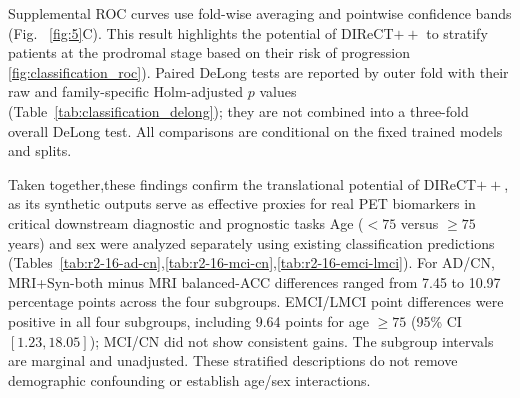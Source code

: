 \documentclass{article}
\providecommand{\DIFaddtex}[1]{{\protect\color{blue} \sf #1}} %
\providecommand{\DIFdeltex}[1]{{\protect\color{red} \scriptsize #1}} %
\providecommand{\DIFaddbegin}{} %
\providecommand{\DIFaddend}{} %
\providecommand{\DIFdelbegin}{} %
\providecommand{\DIFdelend}{} %
\providecommand{\DIFadd}[1]{\texorpdfstring{\DIFaddtex{#1}}{#1}} %
\providecommand{\DIFdel}[1]{\texorpdfstring{\DIFdeltex{#1}}{}} %
\newcommand{\DIFscaledelfig}{0.5}
\newlength{\DIFdelgraphicswidth} %
\newlength{\DIFdelgraphicsheight} %
\newcommand{\DIFaddincludegraphics}[2][]{{\color{blue}\fbox{\DIFOincludegraphics[#1]{#2}}}} %
\newcommand{\DIFdelincludegraphics}[2][]{%
\sbox{\DIFdelgraphicsbox}{\DIFOincludegraphics[#1]{#2}}%
\settoboxwidth{\DIFdelgraphicswidth}{\DIFdelgraphicsbox} %
\settoboxtotalheight{\DIFdelgraphicsheight}{\DIFdelgraphicsbox} %
\scalebox{\DIFscaledelfig}{%
\parbox[b]{\DIFdelgraphicswidth}{\usebox{\DIFdelgraphicsbox}\\[-\baselineskip] \rule{\DIFdelgraphicswidth}{0em}}\llap{\resizebox{\DIFdelgraphicswidth}{\DIFdelgraphicsheight}{%
\setlength{\unitlength}{\DIFdelgraphicswidth}%
\begin{picture}(1,1)%
\thicklines\linethickness{2pt} %
{\color[rgb]{1,0,0}\put(0,0){\framebox(1,1){}}}%
{\color[rgb]{1,0,0}\put(0,0){\line( 1,1){1}}}%
{\color[rgb]{1,0,0}\put(0,1){\line(1,-1){1}}}%
\end{picture}%
}\hspace*{3pt}}} %
} %
\DeclareRobustCommand{\DIFaddbegin}{\DIFOaddbegin \let\includegraphics\DIFaddincludegraphics} %
\DeclareRobustCommand{\DIFaddend}{\DIFOaddend \let\includegraphics\DIFOincludegraphics} %
\DeclareRobustCommand{\DIFdelbegin}{\DIFOdelbegin \let\includegraphics\DIFdelincludegraphics} %
\DeclareRobustCommand{\DIFdelend}{\DIFOaddend \let\includegraphics\DIFOincludegraphics} %
\begin{document}
\DIFadd{Supplemental ROC curves use fold-wise averaging and pointwise confidence bands }\DIFaddend (Fig.~\DIFdelbegin \DIFdel{\ref{fig:5}C). This result highlights the potential of DIReCT$++$ to stratify patients at the prodromal stage based on their risk of progression}\DIFdelend \DIFaddbegin \DIFadd{\ref{fig:classification_roc}). Paired DeLong tests are reported by outer fold with their raw and family-specific Holm-adjusted $p$ values (Table~\ref{tab:classification_delong}); they are not combined into a three-fold overall DeLong test. All comparisons are conditional on the fixed trained models and splits}\DIFaddend .

\DIFdelbegin %

\DIFdel{Taken together,these findings confirm the translational potential of DIReCT$++$, as its synthetic outputs serve as effective proxies for real PET biomarkers in critical downstream diagnostic and prognostic tasks}\DIFdelend \DIFaddbegin \DIFadd{Age ($<75$ versus $\geq75$ years) and sex were analyzed separately using existing classification predictions (Tables~\ref{tab:r2-16-ad-cn},\ref{tab:r2-16-mci-cn},\ref{tab:r2-16-emci-lmci}). For AD/CN, MRI+Syn-both minus MRI balanced-ACC differences ranged from 7.45 to 10.97 percentage points across the four subgroups. EMCI/LMCI point differences were positive in all four subgroups, including 9.64 points for age $\geq75$ (95\% CI $[1.23,18.05]$); MCI/CN did not show consistent gains. The subgroup intervals are marginal and unadjusted. These stratified descriptions do not remove demographic confounding or establish age/sex interactions}\DIFaddend .
\end{document}
